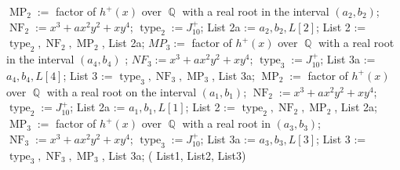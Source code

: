 \documentclass[noend]{amsproc}
\theoremstyle{definition}
\DeclareMathOperator{\MP}{MP}
\DeclareMathOperator{\type}{type}
\DeclareMathOperator{\NF}{NF}
\DeclareMathOperator{\Q}{\mathbb{Q}}
\begin{document}
\begin{algorithm}[ht]
\begin{algorithmic}[1]
\State $\MP_2:= $ factor of $h^+(x)$ over $\Q$ with a real root in the interval $(a_2,b_2)$;
\State $\NF_2:= x^3+ax^2y^2+xy^4$;
\State $\type_2 := J_{10}^+$;
\State List 2a := $a_2,b_2,L[2]$;
\State List 2 := $\type_2, \NF_2, \MP_2$, List 2a;
\State $MP_3:= $ factor of $h^+(x)$ over $\Q$ with a real root in the interval $(a_4,b_4)$ ;
\State $NF_3:= x^3+ax^2y^2+xy^4$;
\State $\type_3 := J_{10}^+$;
\State List 3a := $a_4,b_4,L[4]$;
\State List 3 := $\type_3, \NF_3, \MP_3$, List 3a;
\Else
\State $\MP_2:= $ factor of $h^+(x)$ over $\Q$ with a real root on the interval $(a_1,b_1)$;
\State $\NF_2:= x^3+ax^2y^2+xy^4$;
\State $\type_2 := J_{10}^+$;
\State List 2a := $a_1,b_1,L[1]$;
\State List 2 := $\type_2, \NF_2, \MP_2$, List 2a;
\State $\MP_3:= $ factor of $h^+(x)$ over $\Q$ with a real root in $(a_3,b_3)$;
\State $\NF_3:= x^3+ax^2y^2+xy^4$;
\State $\type_3 := J_{10}^+$;
\State List 3a := $a_3,b_3,L[3]$;
\State List 3 :=$\type_3, \NF_3, \MP_3$, List 3a;
\EndIf
\Return( List1, List2, List3)
\EndIf
\end{algorithmic}
\end{algorithm}
\end{document}
